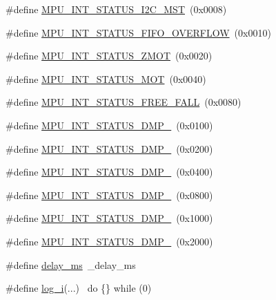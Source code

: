 \begin{DoxyCompactItemize}
\item 
\#define \hyperlink{group___d_r_i_v_e_r_s_ga5755e84f3a2e7d331f7612dbfea18ecc}{M\+P\+U\+\_\+\+I\+N\+T\+\_\+\+S\+T\+A\+T\+U\+S\+\_\+\+I2\+C\+\_\+\+M\+ST}~(0x0008)
\item 
\#define \hyperlink{group___d_r_i_v_e_r_s_gaf8e1684698ad837d0318a72b1ef73b13}{M\+P\+U\+\_\+\+I\+N\+T\+\_\+\+S\+T\+A\+T\+U\+S\+\_\+\+F\+I\+F\+O\+\_\+\+O\+V\+E\+R\+F\+L\+OW}~(0x0010)
\item 
\#define \hyperlink{group___d_r_i_v_e_r_s_gad5eee7ff393f842ca4ae969cc0019030}{M\+P\+U\+\_\+\+I\+N\+T\+\_\+\+S\+T\+A\+T\+U\+S\+\_\+\+Z\+M\+OT}~(0x0020)
\item 
\#define \hyperlink{group___d_r_i_v_e_r_s_gaa1ab51fb5995e568edd425f8486cb2c8}{M\+P\+U\+\_\+\+I\+N\+T\+\_\+\+S\+T\+A\+T\+U\+S\+\_\+\+M\+OT}~(0x0040)
\item 
\#define \hyperlink{group___d_r_i_v_e_r_s_ga000cfa5230cb895c6bad322856465552}{M\+P\+U\+\_\+\+I\+N\+T\+\_\+\+S\+T\+A\+T\+U\+S\+\_\+\+F\+R\+E\+E\+\_\+\+F\+A\+LL}~(0x0080)
\item 
\#define \hyperlink{group___d_r_i_v_e_r_s_ga2398e82f93220e3cfa1ef31bfb6d76bd}{M\+P\+U\+\_\+\+I\+N\+T\+\_\+\+S\+T\+A\+T\+U\+S\+\_\+\+D\+M\+P\+\_}~(0x0100)
\item 
\#define \hyperlink{group___d_r_i_v_e_r_s_ga5ac2e94db5083456fa531fceee0997f5}{M\+P\+U\+\_\+\+I\+N\+T\+\_\+\+S\+T\+A\+T\+U\+S\+\_\+\+D\+M\+P\+\_}~(0x0200)
\item 
\#define \hyperlink{group___d_r_i_v_e_r_s_gab7543433b9679174597e00e5d7cb6279}{M\+P\+U\+\_\+\+I\+N\+T\+\_\+\+S\+T\+A\+T\+U\+S\+\_\+\+D\+M\+P\+\_}~(0x0400)
\item 
\#define \hyperlink{group___d_r_i_v_e_r_s_gaea5cac4528bb19757de4eb4fa46a374f}{M\+P\+U\+\_\+\+I\+N\+T\+\_\+\+S\+T\+A\+T\+U\+S\+\_\+\+D\+M\+P\+\_}~(0x0800)
\item 
\#define \hyperlink{group___d_r_i_v_e_r_s_ga4345dc987e1b65ef8ddc6160f592e144}{M\+P\+U\+\_\+\+I\+N\+T\+\_\+\+S\+T\+A\+T\+U\+S\+\_\+\+D\+M\+P\+\_}~(0x1000)
\item 
\#define \hyperlink{group___d_r_i_v_e_r_s_ga101643480b83c302a4a3089fe9149e8e}{M\+P\+U\+\_\+\+I\+N\+T\+\_\+\+S\+T\+A\+T\+U\+S\+\_\+\+D\+M\+P\+\_}~(0x2000)
\item 
\#define \hyperlink{group___d_r_i_v_e_r_s_gae36aca5baf9b6b7d74992aef00686d67}{delay\+\_\+ms}~\+\_\+delay\+\_\+ms
\item 
\#define \hyperlink{group___d_r_i_v_e_r_s_ga67fc07fa528d8e62dc7b88a847b563f5}{log\+\_\+i}(...)      ~do \{\} while (0)
\item 

\end{DoxyCompactItemize}
